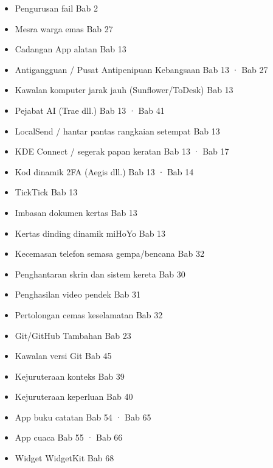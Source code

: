 
\begin{itemize}
  \item Pengurusan fail Bab 2
  \item Mesra warga emas Bab 27
  \item Cadangan App alatan Bab 13
  \item Antigangguan / Pusat Antipenipuan Kebangsaan Bab 13 · Bab 27
  \item Kawalan komputer jarak jauh (Sunflower/ToDesk) Bab 13
  \item Pejabat AI (Trae dll.) Bab 13 · Bab 41
  \item LocalSend / hantar pantas rangkaian setempat Bab 13
  \item KDE Connect / segerak papan keratan Bab 13 · Bab 17
  \item Kod dinamik 2FA (Aegis dll.) Bab 13 · Bab 14
  \item TickTick Bab 13
  \item Imbasan dokumen kertas Bab 13
  \item Kertas dinding dinamik miHoYo Bab 13
  \item Kecemasan telefon semasa gempa/bencana Bab 32
  \item Penghantaran skrin dan sistem kereta Bab 30
  \item Penghasilan video pendek Bab 31
  \item Pertolongan cemas keselamatan Bab 32
  \item Git/GitHub Tambahan Bab 23
  \item Kawalan versi Git Bab 45
  \item Kejuruteraan konteks Bab 39
  \item Kejuruteraan keperluan Bab 40
  \item App buku catatan Bab 54 · Bab 65
  \item App cuaca Bab 55 · Bab 66
  \item Widget WidgetKit Bab 68
\end{itemize}
